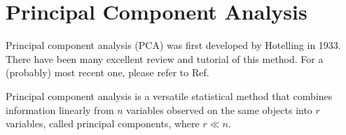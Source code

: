 \section{Principal Component Analysis\label{Sec:DR:PCA}}
Principal component analysis (PCA) was first developed by Hotelling in 1933.\cite{HotellingJEP1933} There have been many excellent review and tutorial of this method. For a (probably) most recent one, please refer to Ref.~\cite{GreenacreNRMP2022}

Principal component analysis is a versatile statistical method that combines information linearly from $n$ variables observed on the same objects into $r$ variables, called principal components, where $r\ll n$.
